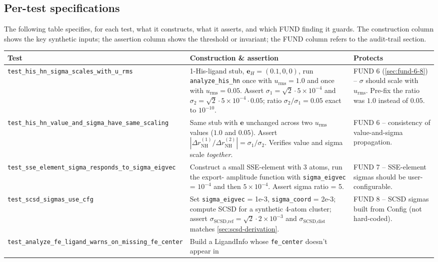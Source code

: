 \documentclass[10pt,a4paper,twoside]{article}
\newcommand{\evec}{\mathbf{e}}
\newcommand{\urms}{u_{\mathrm{rms}}}
\newcommand{\fn}[1]{\texttt{#1}}
\newcommand{\cfgkey}[1]{\texttt{#1}}
\begin{document}
\subsection{Per-test specifications}

The following table specifies, for each test, what it constructs,
what it asserts, and which FUND finding it guards. The
construction column shows the key synthetic inputs; the assertion
column shows the threshold or invariant; the FUND column refers to
the audit-trail section.

\begin{longtable}{p{} p{} p{}}
\toprule
\textbf{Test} & \textbf{Construction \& assertion} & \textbf{Protects} \\
\midrule
\texttt{test\_his\_hn\_sigma\_scales\_with\_u\_rms}
 & 1-His-ligand stub, $\evec_H = (0.1, 0, 0)$, run
   \fn{analyze\_his\_hn} once with $\urms = 1.0$ and once with
   $\urms = 0.05$. Assert
   $\sigma_1 = \sqrt{2}\cdot 5\!\times\!10^{-4}$ and
   $\sigma_2 = \sqrt{2}\cdot 5\!\times\!10^{-4}\cdot 0.05$;
   ratio $\sigma_2/\sigma_1 = 0.05$ exact to $10^{-10}$.
 & FUND 6 (\cref{sec:fund-6-8}) -- $\sigma$ should scale with
   $\urms$. Pre-fix the ratio was $1.0$ instead of $0.05$. \\
\midrule
\texttt{test\_his\_hn\_value\_and\_sigma\_have\_same\_scaling}
 & Same stub with $\evec$ unchanged across two $\urms$ values
   ($1.0$ and $0.05$). Assert
   $|\Delta r_\text{NH}^{(1)} / \Delta r_\text{NH}^{(2)}|
    = \sigma_1 / \sigma_2$. Verifies value and sigma scale
   \emph{together}.
 & FUND 6 -- consistency of value-and-sigma propagation. \\
\midrule
\texttt{test\_sse\_element\_sigma\_responds\_to\_sigma\_eigvec}
 & Construct a small SSE-element with 3 atoms, run the export-
   amplitude function with \cfgkey{sigma\_eigvec} = $10^{-4}$ and
   then $5\!\times\!10^{-4}$. Assert sigma ratio = 5.
 & FUND 7 -- SSE-element sigmas should be user-configurable. \\
\midrule
\texttt{test\_scsd\_sigmas\_use\_cfg}
 & Set \cfgkey{sigma\_eigvec} = 1e-3, \cfgkey{sigma\_coord} = 2e-3;
   compute SCSD for a synthetic 4-atom cluster; assert
   $\sigma_\text{SCSD,ref} = \sqrt{2}\cdot 2\!\times\!10^{-3}$ and
   $\sigma_\text{SCSD,dist}$ matches \cref{sec:scsd-derivation}.
 & FUND 8 -- SCSD sigmas built from Config (not hard-coded). \\
\midrule
\texttt{test\_analyze\_fe\_ligand\_warns\_on\_missing\_fe\_center}
 & Build a LigandInfo whose \texttt{fe\_center} doesn't appear in

\end{longtable}
\end{document}
